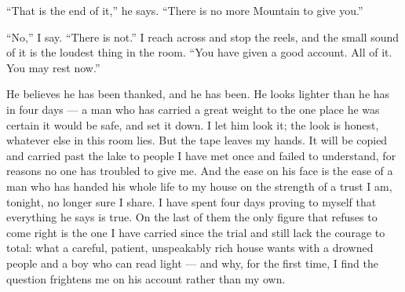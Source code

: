 ``That is the end of it,'' he says. ``There is no more Mountain to give you.''\par

``No,'' I say. ``There is not.'' I reach across and stop the reels, and the small sound of it is the loudest thing in the room. ``You have given a good account. All of it. You may rest now.''\par

He believes he has been thanked, and he has been. He looks lighter than he has in four days --- a man who has carried a great weight to the one place he was certain it would be safe, and set it down. I let him look it; the look is honest, whatever else in this room lies. But the tape leaves my hands. It will be copied and carried past the lake to people I have met once and failed to understand, for reasons no one has troubled to give me. And the ease on his face is the ease of a man who has handed his whole life to my house on the strength of a trust I am, tonight, no longer sure I share. I have spent four days proving to myself that everything he says is true. On the last of them the only figure that refuses to come right is the one I have carried since the trial and still lack the courage to total: what a careful, patient, unspeakably rich house wants with a drowned people and a boy who can read light --- and why, for the first time, I find the question frightens me on his account rather than my own.\par

\ornament
